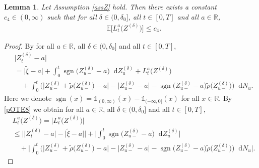 \documentclass[11pt,a4paper]{article}
\numberwithin{equation}{section}
\newtheorem{lemma}[theorem]{Lemma}
\theoremstyle{definition}
\newcommand{\E}{{\mathbb{E}}}
\newcommand{\R}{{\mathbb{R}}}
\newcommand{\diff}{\mathop{}\!\mathrm{d}}
\begin{document}
\begin{lemma}\label{Lem:LocTime}
    Let Assumption \ref{assZ} hold. Then there exists a constant $c_4\in(0,\infty)$ such that for all $\delta\in(0,\delta_0]$, all $t\in[0,T]$ and all $a\in\R$, 
    \begin{equation}\label{LocTimeEst}
        \begin{aligned}
        &\E\big[L^a_t \big(Z^{(\delta)}\big)\big] 
        \leq c_4.
        \end{aligned}
    \end{equation}
\end{lemma}

\begin{proof}
     By \cite[Lemma 158]{situ2005} for all $a\in\R$, all $\delta \in(0,\delta_0]$ and all $t\in[0,T]$,
    \begin{equation}\label{pOTE8}
        \begin{aligned}
        &\big| Z^{(\delta)}_t - a\big|\\
        &= \big| \widetilde\xi -a\big|
        +\int_0^t \operatorname{sgn}\big(Z^{(\delta)}_{u-} -a\big) \diff Z^{(\delta)}_{u}
        +L^a_t \big(Z^{(\delta)}\big) \\
        &\quad+ \int_0^t \Big( \big| Z^{(\delta)}_{u-} + \widetilde\rho\big(Z^{(\delta)}_{u-}\big)- a\big| - \big| Z^{(\delta)}_{u-} - a\big| - \operatorname{sgn}\big(Z^{(\delta)}_{u-} -a\big) \widetilde\rho\big(Z^{(\delta)}_{u-}\big)\Big) \diff N_u.
        \end{aligned}
    \end{equation}
Here we denote $\operatorname{sgn}(x) = \mathds{1}_{(0,\infty)}(x) - \mathds{1}_{(-\infty,0]}(x)$ for all $x\in\R$. By \eqref{pOTE8} we obtain for all $a\in\R$, all $\delta \in(0,\delta_0]$ and all $t\in[0,T]$,
\begin{equation}\label{pOTE9}
    \begin{aligned}
    &L^a_t \big(Z^{(\delta)}\big) = \big|L^a_t \big(Z^{(\delta)}\big)\big|\\
    &\leq \Big|\big| Z^{(\delta)}_t - a\big| - \big| \widetilde\xi -a\big|\Big| 
    + \Big|\int_0^t \operatorname{sgn}\big(Z^{(\delta)}_{u-} -a\big) \diff Z^{(\delta)}_{u}\Big|\\
    &\quad + \Big|\int_0^t \Big( \big| Z^{(\delta)}_{u-} + \widetilde\rho\big(Z^{(\delta)}_{u-}\big)- a\big| - \big| Z^{(\delta)}_{u-} - a\big| - \operatorname{sgn}\big(Z^{(\delta)}_{u-} -a\big) \widetilde\rho\big(Z^{(\delta)}_{u-}\big)\Big) \diff N_u\Big|.
    \end{aligned}

\end{equation}
\end{proof}
\end{document}
